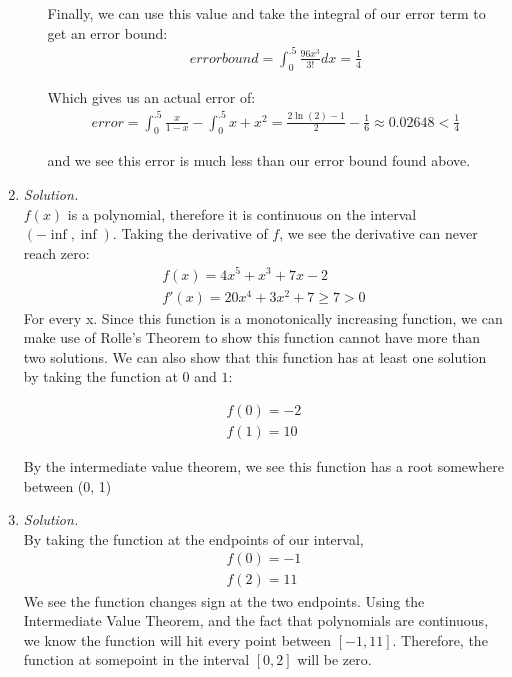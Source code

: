 \documentclass[12pt,letterpaper]{article}
\begin{document}
\begin{enumerate}
\begin{enumerate}
                Finally, we can use this value and take the integral of our error term to get an error bound:
                \begin{eqnarray*}
                    errorbound = \int_{0}^{.5} \frac{96x^3}{3!}dx = \frac{1}{4}
                \end{eqnarray*}

                Which gives us an actual error of: 
                \begin{eqnarray*}
                    error = \int_{0}^{.5} \frac{x}{1-x} - \int_{0}^{.5} x + x^2 = \frac{2\ln(2)-1}{2} - \frac{1}{6} \approx 0.02648 < \frac{1}{4}
                \end{eqnarray*}

                and we see this error is much less than our error bound found above. 
            \end{enumerate}
        \item \emph{Solution.} \\
            $f(x)$ is a polynomial, therefore it is continuous on the interval $(-\inf, \inf)$.
            Taking the derivative of $f$, we see the derivative can never reach zero: 
            \begin{eqnarray*}
                f(x) = 4x^5 + x^3 + 7x -2\\
                f'(x) = 20x^4 + 3x^2 + 7 \geq 7 > 0
            \end{eqnarray*}
            For every x. Since this function is a monotonically increasing function, 
            we can make use of Rolle's Theorem to show this function cannot have more
            than two solutions. We can also show that this function has at least one 
            solution by taking the function at $0$ and $1$: 

            \begin{eqnarray*}
                f(0) = -2\\
                f(1) = 10
            \end{eqnarray*}

            By the intermediate value theorem, we see this function has a root somewhere 
            between (0, 1)
        \item \emph{Solution.} \\
            By taking the function at the endpoints of our interval, 
            \begin{eqnarray*}
                f(0) = -1\\
                f(2) = 11
            \end{eqnarray*}
            We see the function changes sign at the two endpoints. Using the Intermediate
            Value Theorem, and the fact that polynomials are continuous, we know the function
            will hit every point between $[-1, 11]$. Therefore, the function at somepoint
            in the interval $[0, 2]$ will be zero. 
        

\end{enumerate}
\end{document}
